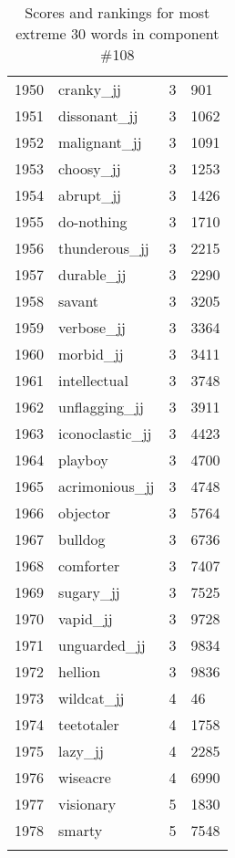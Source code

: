 \begin{longtable}[!htbp]{| rlr@{.}l |}
    1950 & cranky\_jj & 3 & 901 \\
    1951 & dissonant\_jj & 3 & 1062 \\
    1952 & malignant\_jj & 3 & 1091 \\
    1953 & choosy\_jj & 3 & 1253 \\
    1954 & abrupt\_jj & 3 & 1426 \\
    1955 & do-nothing & 3 & 1710 \\
    1956 & thunderous\_jj & 3 & 2215 \\
    1957 & durable\_jj & 3 & 2290 \\
    1958 & savant & 3 & 3205 \\
    1959 & verbose\_jj & 3 & 3364 \\
    1960 & morbid\_jj & 3 & 3411 \\
    1961 & intellectual & 3 & 3748 \\
    1962 & unflagging\_jj & 3 & 3911 \\
    1963 & iconoclastic\_jj & 3 & 4423 \\
    1964 & playboy & 3 & 4700 \\
    1965 & acrimonious\_jj & 3 & 4748 \\
    1966 & objector & 3 & 5764 \\
    1967 & bulldog & 3 & 6736 \\
    1968 & comforter & 3 & 7407 \\
    1969 & sugary\_jj & 3 & 7525 \\
    1970 & vapid\_jj & 3 & 9728 \\
    1971 & unguarded\_jj & 3 & 9834 \\
    1972 & hellion & 3 & 9836 \\
    1973 & wildcat\_jj & 4 & 46 \\
    1974 & teetotaler & 4 & 1758 \\
    1975 & lazy\_jj & 4 & 2285 \\
    1976 & wiseacre & 4 & 6990 \\
    1977 & visionary & 5 & 1830 \\
    1978 & smarty & 5 & 7548 \\
    \hline
    \caption{Scores and rankings for most extreme 30 words in component \#108} \\
\end{longtable}
